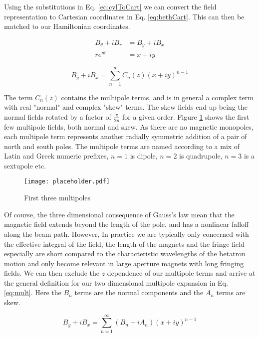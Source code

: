 Using the substitutions in Eq. \ref{eq:cylToCart} we can convert the field representation to Cartesian coordinates in Eq. \ref{eq:bethCart}. This can then be matched to our Hamiltonian coordinates.

\begin{equation} \label{eq:cylToCart}
\begin{split}
	B_{\theta} + i B_r &= B_y + i B_x\\
	r e^{i\theta} &= x + iy
\end{split}
\end{equation}

\begin{equation} \label{eq:bethCart}
	B_y + iB_x = \sum_{n=1}^{\infty} C_n(z) (x + iy)^{n-1}
\end{equation}

The term $C_n(z)$ contains the multipole terms, and is in general a complex term with real "normal" and complex "skew" terms. The skew fields end up being the normal fields rotated by a factor of $\frac{\pi}{2n}$ for a given order. Figure \ref{fig:multipoles} shows the first few multipole fields, both normal and skew. As there are no magnetic monopoles, each multipole term represents another radially symmetric addition of a pair of north and south poles. The multipole terms are named according to a mix of Latin and Greek numeric prefixes, $n=1$ is dipole, $n=2$ is quadrupole, $n=3$ is a sextupole etc.

\begin{figure} \label{fig:multipoles}
	\centering
	\texttt{[image: placeholder.pdf]}
	\caption{First three multipoles}
\end{figure}


Of course, the three dimensional consequence of Gauss's law mean that the magnetic field extends beyond the length of the pole, and has a nonlinear falloff along the beam path. However, In practice we are typically only concerned with the effective integral of the field, the length of the magnets and the fringe field especially are short compared to the characteristic wavelengths of the betatron motion and only become relevant in large aperture magnets with long fringing fields. We can then exclude the $z$ dependence of our multipole terms and arrive at the general definition for our two dimensional multipole expansion in Eq. \ref{eq:mult}. Here the $B_n$ terms are the normal components and the $A_n$ terms are skew. 

\begin{equation} \label{eq:mult}
	B_y + iB_x = \sum_{n=1}^{\infty} (B_n + iA_n) (x + iy)^{n-1}
\end{equation}

